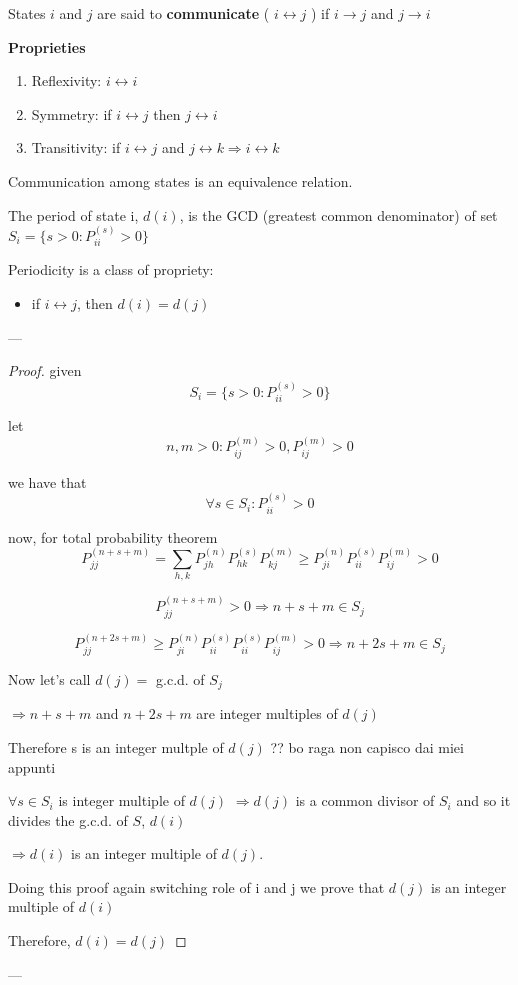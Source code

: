 	\begin{definition}
		States $i$ and $j$ are said to {\bfseries communicate} ( $ i \leftrightarrow j$ ) if
		$i \rightarrow j$ and $j \rightarrow i$
	\end{definition}

	{\bfseries Proprieties}
	\begin{enumerate}
		\item Reflexivity: \quad $i \leftrightarrow i$
		\item Symmetry: \quad if $i \leftrightarrow j$ then $j \leftrightarrow i$
		\item Transitivity: \quad if $i \leftrightarrow j$ and $j \leftrightarrow k \Rightarrow i \leftrightarrow k$
	\end{enumerate}
	Communication among states is an equivalence relation.

	\begin{definition}[Periodicity]
		The period of state i, $d(i)$, is the GCD (greatest common denominator) of set $S_i = \{ s>0 : P_{ii}^{(s)} >0 \}$
	\end{definition}

	\begin{theorem} Periodicity is a class of propriety:
		\begin{itemize}
			\item if $i \leftrightarrow j$, then $d(i) = d(j)$
		\end{itemize}
	\end{theorem}
	---

	\begin{proof}
		given $$S_i = \{ s>0 : P_{ii}^{(s)} >0 \}$$
		
		let $$n, m >0 : P_{ij}^{(m)} >0, P_{ij}^{(m)} > 0$$
		
		we have that $$\forall s \in S_i : P_{ii}^{(s)} > 0$$
		
		now, for total probability theorem$$P_{jj}^{(n+s+m)} = \sum_{h, k} P_{jh}^{(n)} P_{hk}^{(s)} P_{kj}^{(m)} \geq P_{ji}^{(n)} P_{		ii}^{(s)} P_{ij}^{(m)} >0 $$		
		
		$$P_{jj}^{(n+s+m)} >0 \Rightarrow n+s+m \in S_j$$
		
		$$P_{jj}^{(n+2s+m)} \geq P_{ji}^{(n)} P_{ii}^{(s)} P_{ii}^{(s)} P_{ij}^{(m)} >0 \Rightarrow n+2s+m \in S_j$$
		
		Now let's call $d(j) =$ g.c.d. of $S_j$
		
		$ \Rightarrow n+s+m$ and $n+2s+m$ are integer multiples of $d(j)$
		
		Therefore s is an integer multple of $d(j)$ ?? bo raga non capisco dai miei appunti
		
		$\forall s \in S_i$ is integer multiple of $d(j)$ $\Rightarrow d(j)$ is a common divisor of $S_i$ and so it divides the g.c.d. 		of $S$, $d(i)$		
		
		$\Rightarrow d(i)$ is an integer multiple of $d(j)$.
		
		Doing this proof again switching role of i and j we prove that $d(j)$ is an integer multiple of $d(i)$
		
		Therefore, $d(i) = d(j)$
		
	\end{proof}
	---

